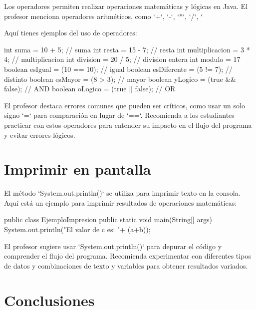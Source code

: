 \documentclass[a4paper]{report}
\begin{document}
Los operadores permiten realizar operaciones matemáticas y lógicas en Java. El profesor menciona operadores aritméticos, como `+`, `-`, `*`, `/`, `%

Aquí tienes ejemplos del uso de operadores:

\begin{roundedlst}
int suma = 10 + 5; // suma
int resta = 15 - 7; // resta
int multiplicacion = 3 * 4; // multiplicacion
int division = 20 / 5; // division entera
int modulo = 17 %
boolean esIgual = (10 == 10); // igual
boolean esDiferente = (5 != 7); // distinto
boolean esMayor = (8 > 3); // mayor
boolean yLogico = (true && false); // AND 
boolean oLogico = (true || false); // OR 
\end{roundedlst}



El profesor destaca errores comunes que pueden ser críticos, como usar un solo signo `=` para comparación en lugar de `==`. Recomienda a los estudiantes practicar con estos operadores para entender su impacto en el flujo del programa y evitar errores lógicos.



\section{Imprimir en pantalla}

El método `System.out.println()` se utiliza para imprimir texto en la consola. Aquí está un ejemplo para imprimir resultados de operaciones matemáticas:

\begin{roundedlst}
public class EjemploImpresion {
    public static void main(String[] args) {
        System.out.println("El valor de c es: "+ (a+b));
    }
}
\end{roundedlst}



El profesor sugiere usar `System.out.println()` para depurar el código y comprender el flujo del programa. Recomienda experimentar con diferentes tipos de datos y combinaciones de texto y variables para obtener resultados variados.

\section{Conclusiones}
\end{document}
